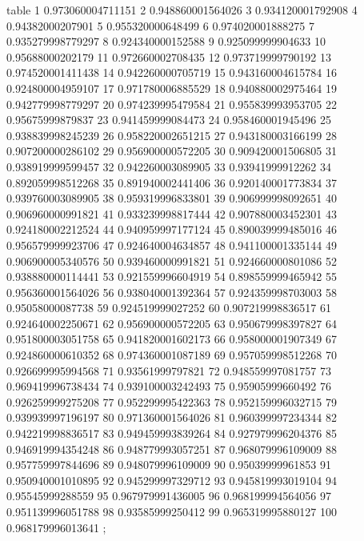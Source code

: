 \nextgroupplot[title=Seed 0,
height=\figheight,
legend cell align={left},
legend columns=-1,
legend style={
  nodes={scale=0.85},
  fill opacity=0.8,
  draw opacity=1,
  text opacity=1,
  at={(-0.20,1.36)},%
  anchor=south west,
  draw=white!80!black
},
minor xtick={25, 75},
minor ytick={},
tick align=outside,
tick pos=left,
width=\figwidth,
x grid style={white!69.0196078431373!black},
xlabel={Eval. Steps},
xminorgrids,
xmajorgrids,
xmin=-3.95, xmax=104.95,
xtick style={color=black},
xtick={-25,0,50,100,125},
xticklabels={-25,0,50,100,125},
y grid style={white!69.0196078431373!black},
ylabel={ACC (\%)},
ymajorgrids,
ymin=0.88, ymax=0.982,
ytick style={color=black},
ytick={0.88,0.9,0.92,0.94,0.96,0.98,1},
yticklabels={88,90,92,94,96,98,100}
]
table {%
	1 0.973060004711151
	2 0.948860001564026
	3 0.934120001792908
	4 0.94382000207901
	5 0.955320000648499
	6 0.974020001888275
	7 0.935279998779297
	8 0.924340000152588
	9 0.925099999904633
	10 0.95688000202179
	11 0.972660002708435
	12 0.973719999790192
	13 0.974520001411438
	14 0.942260000705719
	15 0.943160004615784
	16 0.924800004959107
	17 0.971780006885529
	18 0.940880002975464
	19 0.942779998779297
	20 0.974239995479584
	21 0.955839993953705
	22 0.95675999879837
	23 0.941459999084473
	24 0.958460001945496
	25 0.938839998245239
	26 0.958220002651215
	27 0.943180003166199
	28 0.907200000286102
	29 0.956900000572205
	30 0.909420001506805
	31 0.938919999599457
	32 0.942260003089905
	33 0.93941999912262
	34 0.892059998512268
	35 0.891940002441406
	36 0.920140001773834
	37 0.939760003089905
	38 0.959319996833801
	39 0.906999998092651
	40 0.906960000991821
	41 0.933239998817444
	42 0.907880003452301
	43 0.924180002212524
	44 0.940959997177124
	45 0.890039999485016
	46 0.956579999923706
	47 0.924640004634857
	48 0.941100001335144
	49 0.906900005340576
	50 0.939460000991821
	51 0.924660000801086
	52 0.938880000114441
	53 0.921559996604919
	54 0.898559999465942
	55 0.956360001564026
	56 0.938040001392364
	57 0.924359998703003
	58 0.95058000087738
	59 0.924519999027252
	60 0.907219998836517
	61 0.924640002250671
	62 0.956900000572205
	63 0.950679998397827
	64 0.951800003051758
	65 0.941820001602173
	66 0.958000001907349
	67 0.924860000610352
	68 0.974360001087189
	69 0.957059998512268
	70 0.926699995994568
	71 0.93561999797821
	72 0.948559997081757
	73 0.969419996738434
	74 0.939100003242493
	75 0.95905999660492
	76 0.926259999275208
	77 0.952299995422363
	78 0.952159996032715
	79 0.939939997196197
	80 0.971360001564026
	81 0.960399997234344
	82 0.942219998836517
	83 0.949459993839264
	84 0.927979996204376
	85 0.946919994354248
	86 0.948779993057251
	87 0.968079996109009
	88 0.957759997844696
	89 0.948079996109009
	90 0.95039999961853
	91 0.950940001010895
	92 0.945299997329712
	93 0.945819993019104
	94 0.95545999288559
	95 0.967979991436005
	96 0.968199994564056
	97 0.951139996051788
	98 0.93585999250412
	99 0.965319995880127
	100 0.968179996013641
};
